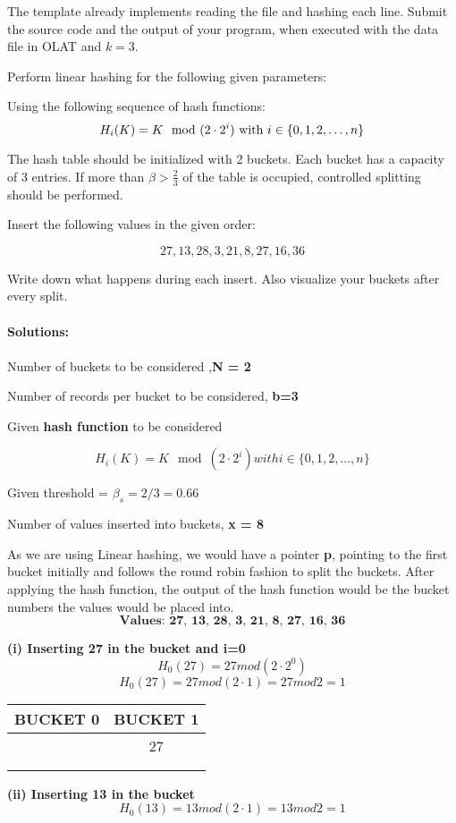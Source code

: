 The template already implements reading the file and hashing each line.
Submit the source code and the output of your program, when executed with the data file in OLAT and $k=3$.

\newpage
{}

Perform linear hashing for the following given parameters:

Using the following sequence of hash functions:
\[
H_i(K) = K \mod (2 \cdot 2^i) \textnormal{ with } i \in \{0, 1, 2, \dots, n\}
\]

The hash table should be initialized with 2 buckets.
Each bucket has a capacity of 3 entries.
If more than $\beta > \frac{2}{3}$ of the table is occupied, controlled splitting should be performed.

Insert the following values in the given order:

\[
27, 13, 28, 3, 21, 8, 27, 16, 36
\]

Write down what happens during each insert.
Also visualize your buckets after every split.\\\\
{\bf Solutions:}\\\\
Number of buckets to be considered ,\textbf{N = 2}

Number of records per bucket to be considered, \textbf{b=3}

Given \textbf{hash function} to be considered 

    \[H_i(K) = K \mod (2 \cdot 2^i) with i \in \{0, 1, 2, \dots, n\}\]

Given threshold = $\beta_s = 2/3 = 0.66$

Number of values inserted into buckets, \textbf{x = 8}

As we are using Linear hashing, we would have a pointer\textbf{ p}, pointing to the first bucket initially and follows the round robin fashion to split the buckets.
After applying the hash function, the output of the hash function would be the bucket numbers the values would be placed into.
\[\textbf{Values: 27, 13, 28, 3, 21, 8, 27, 16, 36}\]
\begin{center}
  \textbf{(i) Inserting 27 in the bucket and i=0}
  \[H_0(27) = 27 mod (2 \cdot 2^0)\]
  \[H_0(27) = 27 mod (2 \cdot 1) = 27 mod 2 = 1\] 
    
\end{center}

\begin{center}
\begin{tabular}{ |c|c| } 
 \hline
  \textbf{\color{red}{P}} BUCKET 0 & BUCKET 1 \\ [0.5ex] 
 \hline\hline
 \hline
   & 27 \\ 
   &    \\
   &    \\
 \hline
\end{tabular}
\end{center}
\textbf{(ii) Inserting 13 in the bucket}
\[H_0(13) = 13 mod (2 \cdot 1)  = 13 mod 2 = 1\] 

